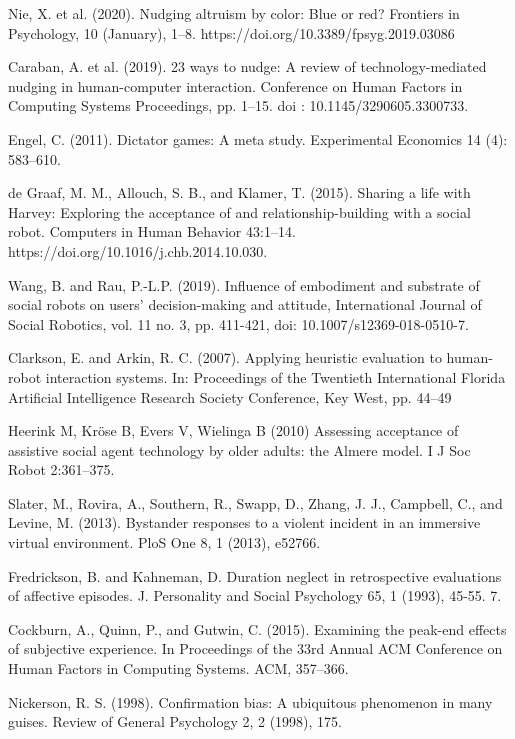 \documentclass[runningheads]{llncs}
\begin{document}
\begin{thebibliography}{8}
Nie, X. et al. (2020). Nudging altruism by color: Blue or red? Frontiers in Psychology, 10 (January), 1–8. https://doi.org/10.3389/fpsyg.2019.03086


Caraban, A. et al. (2019). 23 ways to nudge: A review of technology-mediated nudging in human-computer interaction. Conference on Human Factors in Computing Systems Proceedings, pp. 1–15. doi : 10.1145/3290605.3300733.

Engel, C. (2011). Dictator games: A meta study. Experimental Economics 14 (4): 583–610.

de Graaf, M. M., Allouch, S. B., and Klamer, T. (2015). Sharing a life with Harvey: Exploring the acceptance of and relationship-building with a social robot. Computers in Human Behavior 43:1–14. https://doi.org/10.1016/j.chb.2014.10.030.


Wang, B. and Rau, P.-L.P. (2019). Influence of embodiment and substrate of social robots on users' decision-making and attitude, International Journal of Social Robotics, vol. 11 no. 3, pp. 411-421, doi: 10.1007/s12369-018-0510-7.

Clarkson, E. and Arkin, R. C. (2007). Applying heuristic evaluation to human-robot interaction systems. In: Proceedings of the Twentieth International Florida Artificial Intelligence Research Society Conference, Key West, pp. 44–49


 Heerink M, Kröse B, Evers V, Wielinga B (2010) Assessing acceptance of assistive social agent technology by older adults: the Almere model. I J Soc Robot 2:361–375.

Slater, M., Rovira, A., Southern, R., Swapp, D., Zhang, J. J., Campbell, C., and Levine, M. (2013). Bystander responses to a violent incident in an immersive virtual environment. PloS One 8, 1 (2013), e52766.


Fredrickson, B. and Kahneman, D. Duration neglect in retrospective evaluations of affective episodes. J. Personality and Social Psychology 65, 1 (1993), 45-55. 7.

Cockburn, A., Quinn, P., and Gutwin, C. (2015). Examining the peak-end effects of subjective experience. In Proceedings of the 33rd Annual ACM Conference on Human Factors in Computing Systems. ACM, 357–366.

Nickerson, R. S. (1998). Confirmation bias: A ubiquitous phenomenon in many guises. Review of General Psychology 2, 2 (1998), 175.


\end{thebibliography}
\end{document}
